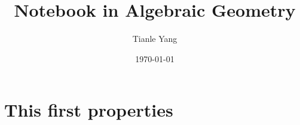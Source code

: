 \documentclass{notetobook}
\title{Notebook in Algebraic Geometry}
\author{Tianle Yang}
\date{\today}
\begin{document}
    \pagestyle{empty}
    \maketitle

    \frontmatter
    \pagestyle{mainmatterstyle}

    \tableofcontents

    \mainmatter

    \chapter{This first properties}

     

    

\end{document}
